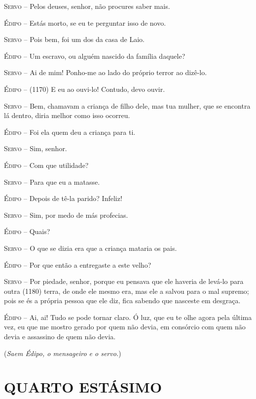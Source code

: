 \textsc{Servo} --   Pelos deuses, senhor, não procures saber mais.

\textsc{Édipo} --   Estás morto, se eu te perguntar isso de novo.

\textsc{Servo} --   Pois bem, foi um dos da casa de Laio.

\textsc{Édipo} --   Um escravo, ou alguém nascido da família daquele?

\textsc{Servo} --   Ai de mim! Ponho-me ao lado do próprio terror ao dizê-lo.

\textsc{Édipo} --   (1170) E eu ao ouvi-lo! Contudo, devo ouvir.

\textsc{Servo} --   Bem, chamavam a criança de filho dele, mas tua mulher, que se encontra
lá dentro, diria melhor como isso ocorreu.

\textsc{Édipo} --   Foi ela quem deu a criança para ti.

\textsc{Servo} --   Sim, senhor.

\textsc{Édipo} --   Com que utilidade?

\textsc{Servo} --   Para que eu a matasse.

\textsc{Édipo} --   Depois de tê-la parido? Infeliz!

\textsc{Servo} --   Sim, por medo de más profecias.

\textsc{Édipo} --   Quais?

\textsc{Servo} --   O que se dizia era que a criança mataria os pais.

\textsc{Édipo} --   Por que então a entregaste a este velho?

\textsc{Servo} --   Por piedade, senhor, porque eu pensava que ele haveria de levá-lo para
outra (1180) terra, de onde ele mesmo era, mas ele a salvou para o mal
supremo; pois se és a própria pessoa que ele diz, fica sabendo que
nasceste em desgraça.

\textsc{Édipo} --   Ai, ai! Tudo se pode tornar claro. Ó luz, que eu te olhe agora pela
última vez, eu que me mostro gerado por quem não devia, em consórcio com
quem não devia e assassino de quem não devia.

(\emph{Saem Édipo, o mensageiro e o servo.})

\section{QUARTO ESTÁSIMO}

